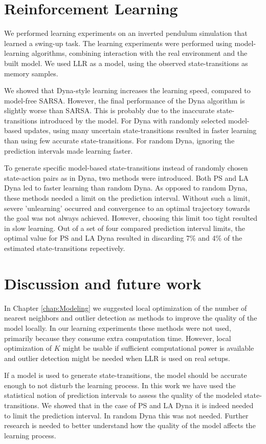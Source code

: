\section{Reinforcement Learning}
We performed learning experiments on an inverted pendulum simulation that learned a swing-up task. The learning experiments were performed using model-learning algorithms, combining interaction with the real environment and the built model. We used \ac{LLR} as a model, using the observed state-transitions as memory samples. 

We showed that Dyna-style learning increases the learning speed, compared to model-free SARSA. However, the final performance of the Dyna algorithm is slightly worse than SARSA. This is probably due to the inaccurate state-transitions introduced by the model. For Dyna with randomly selected model-based updates, using many uncertain state-transitions resulted in faster learning than using few accurate state-transitions. For random Dyna, ignoring the prediction intervals made learning faster.

To generate specific model-based state-transitions instead of randomly chosen state-action pairs as in Dyna, two methods were introduced. Both \ac{PS} and \ac{LA Dyna} led to faster learning than random Dyna. As opposed to random Dyna, these methods needed a limit on the prediction interval. Without such a limit, severe 'unlearning' occurred and convergence to an optimal trajectory towards the goal was not always achieved. However, choosing this limit too tight resulted in slow learning. Out of a set of four compared prediction interval limits, the optimal value for \ac{PS} and \ac{LA Dyna} resulted in discarding 7\% and 4\% of the estimated state-transitions repectively. 



\section{Discussion and future work}
In Chapter \ref{chap:Modeling} we suggested local optimization of the number of nearest neighbors and outlier detection as methods to improve the quality of the model locally. In our learning experiments these methods were not used, primarily because they consume extra computation time. However, local optimization of $K$ might be usable if sufficient computational power is available and outlier detection might be needed when \ac{LLR} is used on real setups.

If a model is used to generate state-transitions, the model should be accurate enough to not disturb the learning process. In this work we have used the statistical notion of prediction intervals to assess the quality of the modeled state-transitions. We showed that in the case of \ac{PS} and \ac{LA Dyna} it is indeed needed to limit the prediction interval. In random Dyna this was not needed. Further research is needed to better understand how the quality of the model affects the learning process. 

